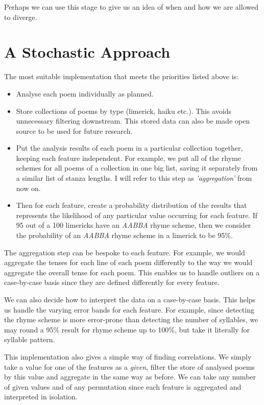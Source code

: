 Perhaps we can use this stage to give us an idea of when and how we are allowed to diverge.


\section{A Stochastic Approach}
\label{sec:approach}

The most suitable implementation that meets the priorities listed above is:
\begin{itemize}
\item{Analyse each poem individually as planned.}
\item{Store collections of poems by type (limerick, haiku etc.). This avoids unnecessary filtering downstream. This stored data can also be made open source to be used for future research.}
\item{Put the analysis results of each poem in a particular collection together, keeping each feature independent. For example, we put all of the rhyme schemes for all poems of a collection in one big list, saving it separately from a similar list of stanza lengths. I will refer to this step as \textit{'aggregation'} from now on.}
\item{Then for each feature, create a probability distribution of the results that represents the likelihood of any particular value occurring for each feature. If 95 out of a 100 limericks have an \textit{AABBA} rhyme scheme, then we consider the probability of an \textit{AABBA} rhyme scheme in a limerick to be 95\%.}
\end{itemize}

The aggregation step can be bespoke to each feature. For example, we would aggregate the tenses for each line of each poem differently to the way we would aggregate the overall tense for each poem. This enables us to handle outliers on a case-by-case basis since they are defined differently for every feature.

We can also decide how to interpret the data on a case-by-case basis. This helps us handle the varying error bands for each feature. For example, since detecting the rhyme scheme is more error-prone than detecting the number of syllables, we may round a 95\% result for rhyme scheme up to 100\%, but take it literally for syllable pattern.

This implementation also gives a simple way of finding correlations. We simply take a value for one of the features as a \textit{given}, filter the store of analysed poems by this value and aggregate in the same way as before. We can take any number of given values and of any permutation since each feature is aggregated and interpreted in isolation.

